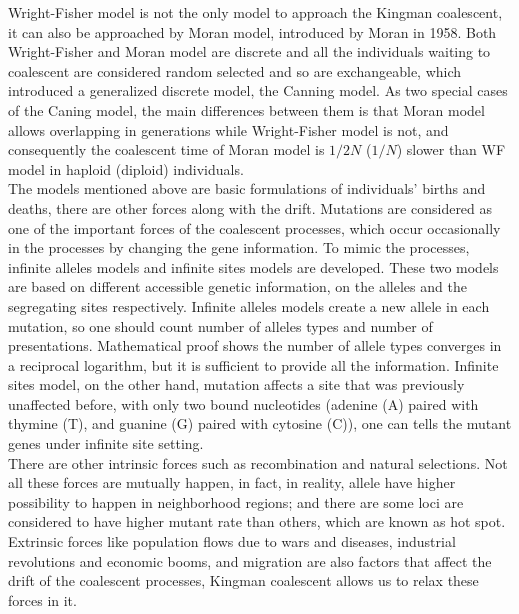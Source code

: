 \documentclass[12pt, a4paper,twoside]{report}
\theoremstyle{definition}
\theoremstyle{myplain}
\theoremstyle{mypro}
\begin{document}
Wright-Fisher model is not the only model to approach the Kingman coalescent, it can also be approached by Moran model, introduced by Moran \cite{Moran} in 1958. Both Wright-Fisher and Moran model are discrete and all the individuals waiting to coalescent are considered random selected and so are exchangeable, which introduced a generalized discrete model, the Canning model. As two special cases of the Caning model, the main differences between them is that Moran model allows overlapping in generations while Wright-Fisher model is not, and consequently the coalescent time of Moran model is $1/2N$ ($1/N$) slower than WF model in haploid (diploid) individuals.\\

The models mentioned above are basic formulations of individuals' births and deaths, there are other forces along with the drift. Mutations are considered as one of the important forces of the coalescent processes, which occur occasionally in the processes by changing the gene information. To mimic the processes, infinite alleles models and infinite sites models are developed. These two models are based on different accessible genetic information, on the alleles and the segregating sites respectively. Infinite alleles models create a new allele in each mutation, so one should count number of alleles types and number of presentations. Mathematical proof shows the number of allele types converges in a reciprocal logarithm, but it is sufficient to provide all the information. Infinite sites model, on the other hand, mutation affects a site that was previously unaffected before, with only two bound nucleotides (adenine (A) paired with thymine (T), and guanine (G) paired with cytosine (C)), one can tells the mutant genes under infinite site setting.\\

There are other intrinsic forces such as recombination and natural selections. Not all these forces are mutually happen, in fact, in reality, allele have higher possibility to happen in neighborhood regions; and there are some loci are considered to have higher mutant rate than others, which are known as hot spot.\\

Extrinsic forces like population flows due to wars and diseases, industrial revolutions and economic booms, and migration are also factors that affect the drift of the coalescent processes, Kingman coalescent allows us to relax these forces in it.\\
\end{document}
